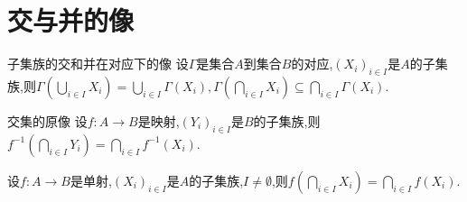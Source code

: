 \section{交与并的像}

\begin{proposition}{子集族的交和并在对应下的像}{}
	设$\Gamma$是集合$A$到集合$B$的对应,$\left(X_{i}\right)_{i\in I}$是$A$的子集族,则$\Gamma\left(\bigcup\limits_{i\in I}X_{i}\right)=\bigcup\limits_{i\in I}\Gamma\left(X_{i}\right),\Gamma\left(\bigcap\limits_{i\in I}X_{i}\right)\subseteq\bigcap\limits_{i\in I}\Gamma\left(X_{i}\right)$.
\end{proposition}

\begin{proposition}{交集的原像}{}
	设$f:A\to B$是映射,$\left(Y_{i}\right)_{i\in I}$是$B$的子集族,则$f^{-1}\left(\bigcap\limits_{i\in I}Y_{i}\right)=\bigcap\limits_{i\in I}f^{-1}\left(X_{i}\right)$.
\end{proposition}

\begin{corollary}{}{}
	设$f:A\to B$是单射,$\left(X_{i}\right)_{i\in I}$是$A$的子集族,$I\neq\emptyset$,则$f\left(\bigcap\limits_{i\in I}X_{i}\right)=\bigcap\limits_{i\in I}f\left(X_{i}\right)$.
\end{corollary}












































